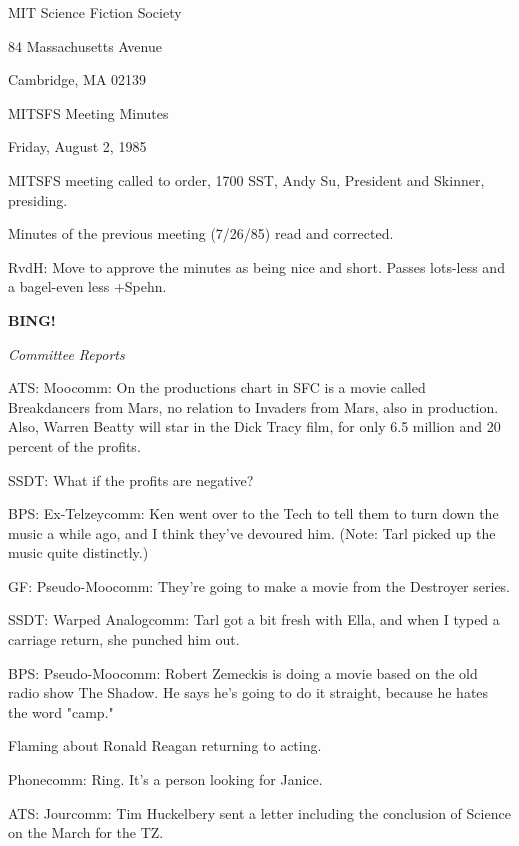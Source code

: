 \documentclass[12pt]{article}
\newcommand{\bing}{{\bf BING!} }
\newcommand{\goto}[1]{\bing \vskip 12pt \centerline{{\em{#1}}}}
\begin{document}
\begin{center}

MIT Science Fiction Society 

84 Massachusetts Avenue

Cambridge, MA 02139

\vspace{12pt}

MITSFS Meeting Minutes 

Friday, August 2, 1985

\end{center}
 
\vspace{18pt}

\setlength{\parskip}{6pt}

\noindent
MITSFS meeting called to order, 1700 SST,
Andy Su, President and Skinner, presiding.

Minutes of the previous meeting (7/26/85) read and corrected.

RvdH: Move to approve the minutes as being nice and short. Passes lots-less and a bagel-even less +Spehn.

\goto{Committee Reports}

ATS: Moocomm: On the productions chart in SFC is a movie called Breakdancers from Mars, no relation to Invaders from Mars, also in production. Also, Warren Beatty will star in the Dick Tracy film, for only 6.5 million and 20 percent of the profits.

SSDT: What if the profits are negative?

BPS: Ex-Telzeycomm: Ken went over to the Tech to tell them to turn down the music a while ago, and I think they've devoured him. (Note: Tarl picked up the music quite distinctly.)

GF: Pseudo-Moocomm: They're going to make a movie from the Destroyer series.

SSDT: Warped Analogcomm: Tarl got a bit fresh with Ella, and when I typed a carriage return, she punched him out.

BPS: Pseudo-Moocomm: Robert Zemeckis is doing a movie based on the old radio show The Shadow. He says he's going to do it straight, because he hates the word "camp."

Flaming about Ronald Reagan returning to acting.

Phonecomm: Ring. It's a person looking for Janice.

ATS: Jourcomm: Tim Huckelbery sent a letter including the conclusion of Science on the March for the TZ.
\end{document}
